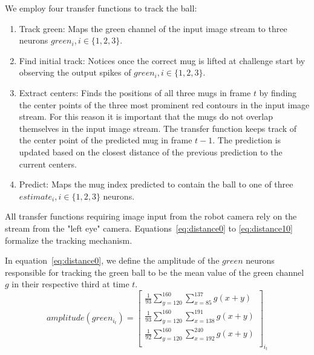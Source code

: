 We employ four transfer functions to track the ball:
\begin{enumerate}

	\item Track green: Maps the green channel of the input image stream to three neurons $green_i, i\in\{1,2,3\}$. 
	\item Find initial track: Notices once the correct mug is lifted at challenge start by observing the output spikes of  $green_i, i\in\{1,2,3\}$.
	\item Extract centers: Finds the positions of all three mugs in frame $t$ by finding the center points of the three most prominent red contours in the input image stream. For this reason it is important that the mugs do not overlap themselves in the input image stream. The transfer function keeps track of the center point of the predicted mug in frame $t-1$. The prediction is updated based on the closest distance of the previous prediction to the current centers.
	\item Predict: Maps the mug index predicted to contain the ball to one of three $estimate_i,  i\in\{1,2,3\}$ neurons.
\end{enumerate}

All transfer functions requiring image input from the robot camera rely on the stream from the "left eye" camera. Equations~\eqref{eq:distance0} to \eqref{eq:distance10} formalize the tracking mechanism.

In equation~\eqref{eq:distance0}, we define the amplitude of the $green$ neurons  responsible for tracking the green ball to be the mean value of the green channel $g$ in their respective third at time $t$.
\begin{equation}
amplitude(green_{i_t}) = \begin{bmatrix}
           \frac{1}{93}\sum\limits_{y=120}^{160}\sum\limits_{x=85}^{137}g(x+y) \\
           \frac{1}{93}\sum\limits_{y=120}^{160}\sum\limits_{x=138}^{191}g(x+y) \\
           \frac{1}{92}\sum\limits_{y=120}^{160}\sum\limits_{x=192}^{240}g(x+y) \\
         \end{bmatrix}_{i_t}  \label{eq:distance0}
\end{equation}
       
